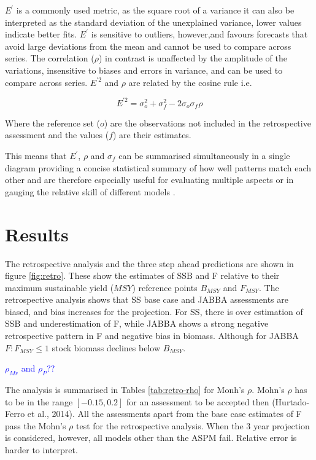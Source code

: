 \documentclass[12pt,halfline,a4paper,nonumbib]{ouparticle}
\newcommand{\toshi}{\textcolor{blue}}
\begin{document}
$E^\prime$ is a commonly used metric, as the square root of a variance it can also be interpreted as the standard deviation of the unexplained variance,  lower values indicate better fits. $E^\prime$ is sensitive to outliers, however,and favours forecasts that avoid large deviations from the mean and cannot be used to compare across series. The correlation ($\rho$) in contrast is unaffected by the amplitude of the variations, insensitive to biases and errors in variance, and can be used to compare across series. $E^{\prime 2}$ and $\rho$ are related by the cosine rule i.e.

 \begin{equation} 
 E^{\prime 2} = \sigma_o^2 + \sigma_f^2 - 2\sigma_o\sigma_f\rho
 \end{equation}

Where the reference set ($o$) are the observations not included in the retrospective assessment and the values ($f$) are their estimates. 
 
This means that $E^\prime$, $\rho$ and $\sigma_f$ can be summarised simultaneously in a single diagram\parencite{taylor2001summarizing} providing a concise statistical summary of how well patterns match each other and are therefore especially useful for evaluating multiple aspects or in gauging the relative skill of different models \parencite{griggs2002climate}.

\section{Results}

The retrospective analysis and the three step ahead predictions are shown in figure \ref{fig:retro}. These show the estimates of SSB and F relative to their maximum sustainable yield ($MSY$) reference points  $B_{MSY}$ and $F_{MSY}$. The retrospective analysis shows that SS base case and JABBA assessments are biased, and bias increases for the projection.  For SS, there is over estimation of SSB and underestimation of F, while JABBA shows a strong negative retrospective pattern in F and negative bias in biomass. Although for JABBA  $F:F_{MSY} \le 1$ stock biomass declines below $B_{MSY}$.

\toshi{$\rho_{Mr}$ and $\rho_P$??}

The analysis is summarised in Tables \ref{tab:retro-rho} for Monh's $\rho$. Mohn's $\rho$ has to be in the range $[-0.15,0.2]$ for an assessment to be accepted then (Hurtado-Ferro et al., 2014). All the assessments apart from the base case estimates of F pass the Mohn's $\rho$ test for the retrospective analysis. When the 3 year projection is considered, however, all models other than the ASPM fail. Relative error is harder to interpret. 
\end{document}
